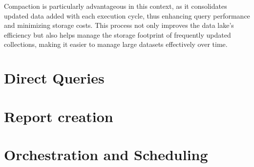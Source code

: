Compaction is particularly advantageous in this context, as it consolidates updated data added with each execution cycle, thus enhancing query performance and minimizing storage costs. This process not only improves the data lake's efficiency but also helps manage the storage footprint of frequently updated collections, making it easier to manage large datasets effectively over time.

\section{Direct Queries}

\section{Report creation}

\section{Orchestration and Scheduling}